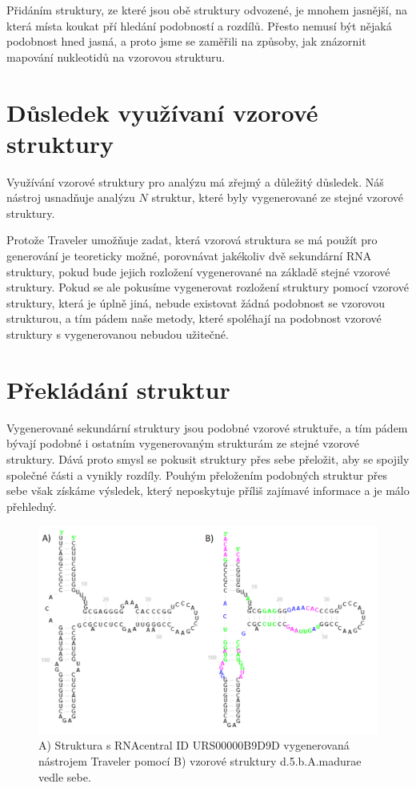 Přidáním struktury, ze které jsou obě struktury odvozené, je mnohem jasnější,
na která místa koukat pří hledání podobností a rozdílů. Přesto nemusí být
nějaká podobnost hned jasná, a proto jsme se zaměřili na způsoby, jak znázornit
mapování nukleotidů na vzorovou strukturu.

\section{Důsledek využívaní vzorové struktury}

Využívání vzorové struktury pro analýzu má zřejmý a důležitý důsledek. Náš
nástroj usnadňuje analýzu $N$ struktur, které byly vygenerované ze stejné
vzorové struktury. 

Protože Traveler umožňuje zadat, která vzorová struktura se má použít pro
generování je teoreticky možné, porovnávat jakékoliv dvě sekundární RNA
struktury, pokud bude jejich rozložení vygenerované na základě stejné vzorové
struktury. Pokud se ale pokusíme vygenerovat rozložení struktury pomocí vzorové
struktury, která je úplně jiná, nebude existovat žádná podobnost se vzorovou
strukturou, a tím pádem naše metody, které spoléhají na podobnost vzorové
struktury s vygenerovanou nebudou užitečné.

\section{Překládání struktur}

Vygenerované sekundární struktury jsou podobné vzorové struktuře, a tím pádem
bývají podobné i ostatním vygenerovaným strukturám ze stejné vzorové struktury.
Dává proto smysl se pokusit struktury přes sebe přeložit, aby se spojily
společné části a vynikly rozdíly. Pouhým přeložením podobných struktur přes
sebe však získáme výsledek, který neposkytuje příliš zajímavé informace a je
málo přehledný.

\begin{figure}[H]
  \centering
  \includegraphics[width=140mm]{../img/kap02/align/structures.png}
  \caption{A) Struktura s RNAcentral ID URS00000B9D9D vygenerovaná nástrojem
  Traveler pomocí B) vzorové struktury d.5.b.A.madurae vedle sebe.}
\end{figure}

